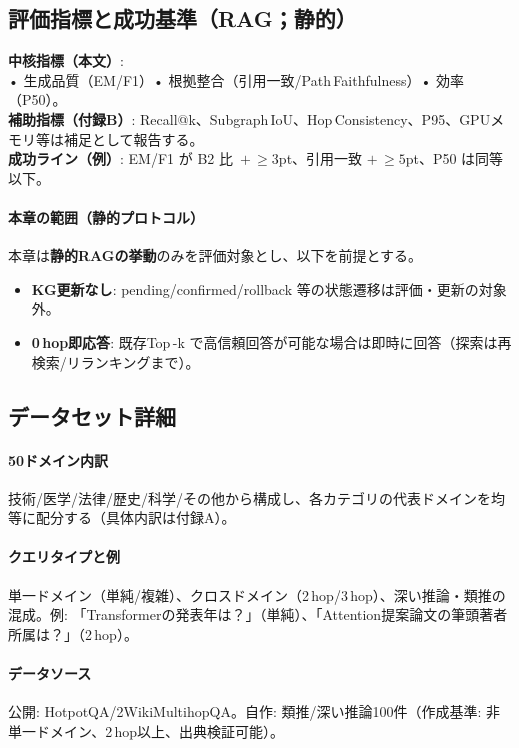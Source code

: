 \documentclass[ja=standard,xelatex]{bxjsarticle}
\begin{document}
\subsection{評価指標と成功基準（RAG；静的）}
\label{sec:rag_metrics_success}
\textbf{中核指標（本文）}: \\
\hspace*{1.2em}• 生成品質（EM/F1）\;\;• 根拠整合（引用一致/Path\,Faithfulness）\;\;• 効率（P50）。\\
\textbf{補助指標（付録B）}: Recall@k、Subgraph\,IoU、Hop\,Consistency、P95、GPUメモリ等は補足として報告する。\\
\textbf{成功ライン（例）}: EM/F1 が B2 比 \,$+\,\ge3$pt、引用一致 $+\,\ge5$pt、P50 は同等以下。\\

\paragraph{本章の範囲（静的プロトコル）} 本章は\textbf{静的RAGの挙動}のみを評価対象とし、以下を前提とする。
\begin{itemize}[leftmargin=1.6em]
  \item \textbf{KG更新なし}: pending/confirmed/rollback 等の状態遷移は評価・更新の対象外。
  \item \textbf{0\,hop即応答}: 既存Top\,\mbox{-}k で高信頼回答が可能な場合は即時に回答（探索は再検索/リランキングまで）。
\end{itemize}

\subsection{データセット詳細}\label{sec:rag_dataset}
\paragraph{50ドメイン内訳}\; 技術/医学/法律/歴史/科学/その他から構成し、各カテゴリの代表ドメインを均等に配分する（具体内訳は付録A）。\\
\paragraph{クエリタイプと例}\; 単一ドメイン（単純/複雑）、クロスドメイン（2\,hop/3\,hop）、深い推論・類推の混成。例: 「Transformerの発表年は？」（単純）、「Attention提案論文の筆頭著者所属は？」（2\,hop）。\\
\paragraph{データソース}\; 公開: HotpotQA/2WikiMultihopQA。自作: 類推/深い推論100件（作成基準: 非単一ドメイン、2\,hop以上、出典検証可能）。\\
\end{document}

